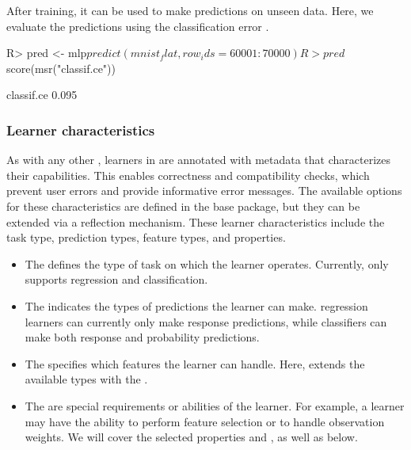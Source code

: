 \documentclass[article]{jss}
\theoremstyle{definition}
\begin{document}
After training, it can be used to make predictions on unseen data.
Here, we evaluate the predictions using the classification error .

\begin{CodeInput}
R> pred <- mlp$predict(mnist_flat, row_ids = 60001:70000)
R> pred$score(msr("classif.ce"))
\end{CodeInput}

\begin{CodeOutput}
classif.ce
     0.095
\end{CodeOutput}

\subsubsection{Learner characteristics}\label{sec:learner-characteristics}

As with any other , learners in  are annotated with metadata that characterizes their capabilities.
This enables correctness and compatibility checks, which prevent user errors and provide informative error messages.
The available options for these characteristics are defined in the  base package, but they can be extended via a reflection mechanism.
These learner characteristics include the task type, prediction types, feature types, and properties.


\begin{itemize}
    \item The  defines the type of task on which the learner operates. Currently,  only supports regression and classification.
    \item The  indicates the types of predictions the learner can make. \torch{} regression learners can currently only make response predictions, while classifiers can make both response and probability predictions.
    \item The  specifies which features the learner can handle. Here, \mlrttorch{} extends the available types with the .
    \item The  are special requirements or abilities of the learner. For example, a learner may have the ability to perform feature selection or to handle observation weights. We will cover the selected properties  and , as well as  below.
\end{itemize}
\end{document}
